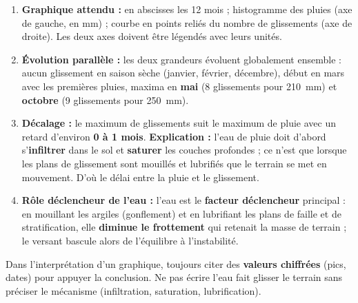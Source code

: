 \documentclass[11pt]{article}
\begin{document}
\begin{corrige}
\tcblower
\begin{enumerate}
\item \textbf{Graphique attendu :} en abscisses les 12 mois ; histogramme des pluies (axe de gauche, en mm) ; courbe en points reliés du nombre de glissements (axe de droite). Les deux axes doivent être légendés avec leurs unités.
\item \textbf{Évolution parallèle :} les deux grandeurs évoluent globalement ensemble : aucun glissement en saison sèche (janvier, février, décembre), début en mars avec les premières pluies, maxima en \textbf{mai} (8 glissements pour \SI{210}{mm}) et \textbf{octobre} (9 glissements pour \SI{250}{mm}).
\item \textbf{Décalage :} le maximum de glissements suit le maximum de pluie avec un retard d'environ \textbf{0 à 1 mois}. \textbf{Explication :} l'eau de pluie doit d'abord s'\textbf{infiltrer} dans le sol et \textbf{saturer} les couches profondes ; ce n'est que lorsque les plans de glissement sont mouillés et lubrifiés que le terrain se met en mouvement. D'où le délai entre la pluie et le glissement.
\item \textbf{Rôle déclencheur de l'eau :} l'eau est le \textbf{facteur déclencheur} principal : en mouillant les argiles (gonflement) et en lubrifiant les plans de faille et de stratification, elle \textbf{diminue le frottement} qui retenait la masse de terrain ; le versant bascule alors de l'équilibre à l'instabilité.
\end{enumerate}
\end{corrige}
\begin{attention}
Dans l'interprétation d'un graphique, toujours citer des \textbf{valeurs chiffrées} (pics, dates) pour appuyer la conclusion. Ne pas écrire \og l'eau fait glisser le terrain \fg{} sans préciser le mécanisme (infiltration, saturation, lubrification).
\end{attention}
\end{document}
